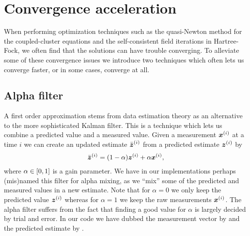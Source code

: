     \section{Convergence acceleration}
        \label{sec:convergence}
        When performing optimization techniques such as the quasi-Newton method
        for the coupled-cluster equations and the self-consistent field
        iterations in Hartree-Fock, we often find that the solutions can have
        trouble converging.
        To alleviate some of these convergence issues we introduce two
        techniques which often lets us converge faster, or in some cases,
        converge at all.

        \subsection{Alpha filter}
            \label{subsec:alpha-filter}
            A first order approximation stems from data estimation theory as an
            alternative to the more sophisticated Kalman filter.
            This is a technique which lets us combine a predicted value and a
            measured value.
            Given a measurement $\boldsymbol{x}^{(i)}$ at a time $i$ we can create an
            updated estimate $\bar{\boldsymbol{z}}^{(i)}$ from a predicted estimate
            $\boldsymbol{z}^{(i)}$ by
            \begin{align}
                \bar{\boldsymbol{z}}^{(i)} = (1 - \alpha) \boldsymbol{z}^{(i)}
                + \alpha \boldsymbol{x}^{(i)},
            \end{align}
            where $\alpha \in \left[ 0, 1 \right]$ is a gain parameter.
            We have in our implementations perhaps (mis)named this filter for
            alpha mixing, as we ``mix'' some of the predicted and measured
            values in a new estimate.
            Note that for $\alpha = 0$ we only keep the predicted value
            $\boldsymbol{z}^{(i)}$ whereas for $\alpha = 1$ we keep the raw
            measurements $\boldsymbol{x}^{(i)}$.
            The alpha filter suffers from the fact that finding a good value for
            $\alpha$ is largely decided by trial and error.
            In our code we have dubbed the measurement vector by
             and the predicted estimate by
            .

